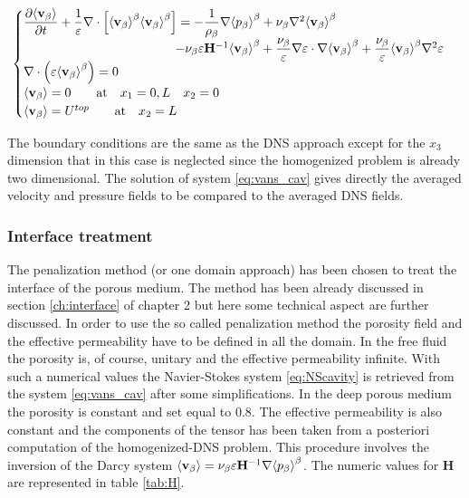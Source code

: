 \begin{eqnarray}
\begin{cases}
\dfrac{\partial {\left< \textbf{v}_{\beta} \right>}}{\partial t} + \dfrac{1}{\varepsilon} \nabla \cdot \left[  {\left< \textbf{v}_{\beta} \right>}^{\beta}  {\left< \textbf{v}_{\beta} \right>}^{\beta} \right] = -\dfrac{1}{\rho_{\beta}} \nabla {\left< p_{\beta}\right>}^{\beta} + \nu_{\beta} \nabla^2 {\left< \textbf{v}_{\beta} \right>}^{\beta} \\ 
\qquad \qquad \qquad \qquad \qquad \qquad- \nu_{\beta} \varepsilon \mathbf{H}^{-1} {\left< \textbf{v}_{\beta} \right>}^{\beta} +\dfrac{\nu_{\beta}}{\varepsilon} \nabla \varepsilon \cdot \nabla {\left< \textbf{v}_{\beta} \right>}^{\beta} + \dfrac{\nu_{\beta}}{\varepsilon} {\left< \textbf{v}_{\beta} \right>}^{\beta} \nabla^2 \varepsilon \\
\nabla \cdot \left(\varepsilon {\left< \textbf{v}_{\beta} \right>}^{\beta} \right) = 0\\
{\left< \textbf{v}_{\beta} \right>} = 0 \qquad \textrm{at} \quad x_1 = 0,L \quad x_2 = 0\\
{\left< \textbf{v}_{\beta} \right>} = U^{top} \qquad \textrm{at} \quad x_2 = L
\label{eq:vans_cav}
\end{cases}
\end{eqnarray}

The boundary conditions are the same as the DNS approach except for the $x_3$ dimension that in this case is neglected since the homogenized problem is already two dimensional.
The solution of system \eqref{eq:vans_cav} gives directly the averaged velocity and pressure fields to be compared to the averaged DNS fields.

\subsubsection{Interface treatment}
The penalization method (or one domain approach) has been chosen to treat the interface of the porous medium.
The method has been already discussed in section \ref{ch:interface}  of chapter 2 but here some technical aspect are further discussed.
In order to use the so called penalization method the porosity field and the effective permeability have to be defined in all the domain. In the free fluid the porosity is, of course, unitary and the effective permeability infinite. With such a numerical values the Navier-Stokes system \eqref{eq:NScavity} is retrieved from the system \eqref{eq:vans_cav} after some simplifications.
In the deep porous medium the porosity is constant and set equal to $0.8$. The effective permeability is also constant and the components of the tensor has been taken from a posteriori computation of the homogenized-DNS problem. This procedure involves the inversion of the Darcy system ${\left< \textbf{v}_{\beta} \right>} = \nu_{\beta} \varepsilon \mathbf{H}^{-1} \nabla {\left< p_{\beta}\right>}^{\beta}$. The numeric values for $\mathbf{H}$ are represented in table \ref{tab:H}.


